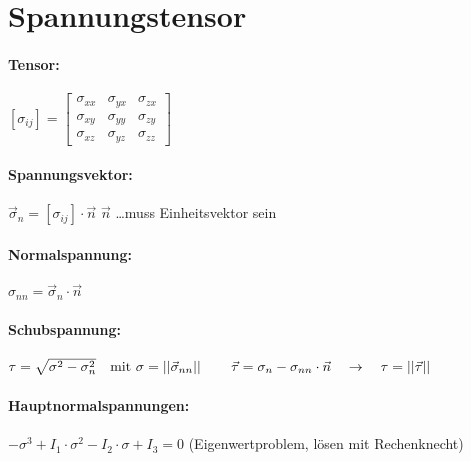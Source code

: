 
\section{Spannungstensor}

\paragraph{Tensor:} 
	$ \left[\sigma_{ij}\right]
		=\left[\begin{matrix}
			\sigma_{xx} & \sigma_{yx} & \sigma_{zx} \\
			\sigma_{xy} & \sigma_{yy} & \sigma_{zy} \\
			\sigma_{xz} & \sigma_{yz} & \sigma_{zz}
		\end{matrix}\right]
	$

\paragraph{Spannungsvektor:}
	$ \vec{\sigma}_n = \left[\sigma_{ij}\right]\cdot\vec{n} $ 
		\quad $ \vec{n} $ \dots muss Einheitsvektor sein
		
\paragraph{Normalspannung:}
	$ \sigma_{nn} = \vec{\sigma}_n\cdot\vec{n} $

\paragraph{Schubspannung:}
	$ \tau = \sqrt{\sigma^2 - \sigma_n^2} 
		\quad \text{mit } \sigma = \left|\left|\vec{\sigma}_{nn}\right|\right|
		\qquad \vec{\tau} = \sigma_n - \sigma_{nn} \cdot \vec{n} 
		\quad  \rightarrow
		\quad \tau = \left|\left|\vec{\tau}\right|\right|
	$
	
\paragraph{Hauptnormalspannungen:}
	$ 	- \sigma^3 + I_1 \cdot \sigma^2 - I_2 \cdot \sigma + I_3 = 0 $ \quad (Eigenwertproblem, lösen mit Rechenknecht)
	

